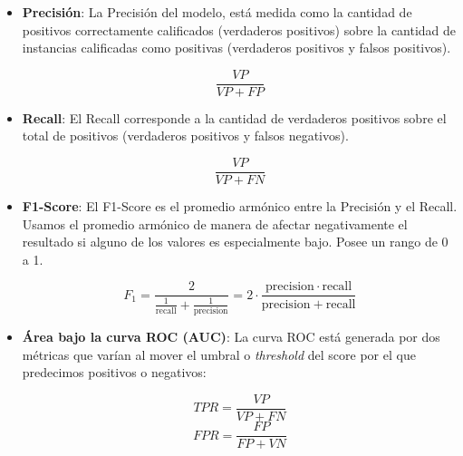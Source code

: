 \begin{itemize}
    \item \textbf{Precisión}: La Precisión del modelo, está medida como la cantidad de positivos correctamente calificados (verdaderos positivos) sobre la cantidad de instancias calificadas como positivas (verdaderos positivos y falsos positivos).
    
    \begin{equation*}
        \frac{VP}{VP + FP}
    \end{equation*}
    
    \item \textbf{Recall}: El Recall corresponde a la cantidad de verdaderos positivos sobre el total de positivos (verdaderos positivos y falsos negativos).
    
    \begin{equation*}
        \frac{VP}{VP + FN}
    \end{equation*}
    
    \item \textbf{F1-Score}: El F1-Score es el promedio armónico entre la Precisión y el Recall. Usamos el promedio armónico de manera de afectar negativamente el resultado si alguno de los valores es especialmente bajo. Posee un rango de 0 a 1. 
    
    \begin{equation*}
        F_1 = \frac{2}{\tfrac{1}{\mathrm{recall}} + \tfrac{1}{\mathrm{precision}}} = 2 \cdot \frac{\mathrm{precision} \cdot \mathrm{recall}}{\mathrm{precision} + \mathrm{recall}}
    \end{equation*}
    
    \newpage
    
    \item \textbf{Área bajo la curva ROC (AUC)}: La curva ROC está generada por dos métricas que varían al mover el umbral o \textit{threshold} del score por el que predecimos positivos o negativos: 
    
    \begin{multicols}{2}
        \begin{equation*}
        TPR = \frac{VP}{VP + FN}
        \end{equation*}
        \break
        \begin{equation*}
        FPR = \frac{FP}{FP + VN} 
        \end{equation*}
    \end{multicols}
    
    
    

    
\end{itemize}

